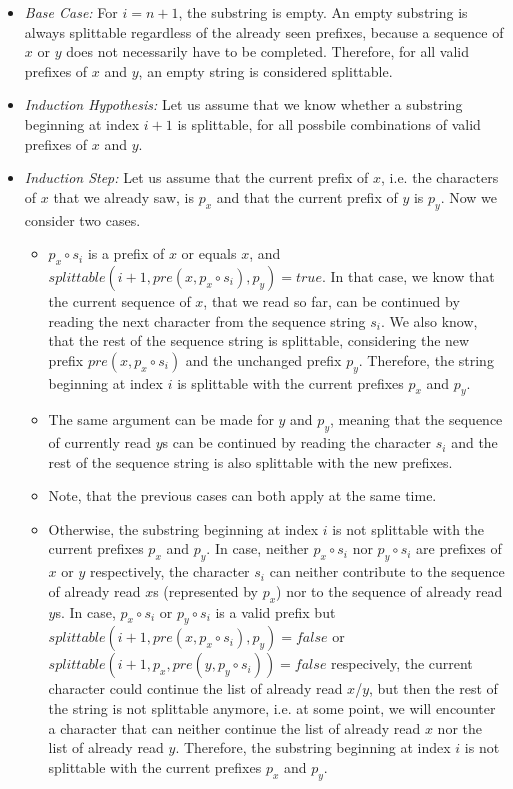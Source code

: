 \documentclass[12pt]{article}
\begin{document}
\begin{itemize}
	\item \emph{Base Case:} For $i = n+1$, the substring is empty. An empty substring is always splittable regardless of the already seen prefixes, because a sequence of $x$ or $y$ does not necessarily have to be completed. Therefore, for all valid prefixes of $x$ and $y$, an empty string is considered splittable.
	\item \emph{Induction Hypothesis:} Let us assume that we know whether a substring beginning at index $i+1$ is splittable, for all possbile combinations of valid prefixes of $x$ and $y$.
	\item \emph{Induction Step:} Let us assume that the current prefix of $x$, i.e. the characters of $x$ that we already saw, is $p_x$ and that the current prefix of $y$ is $p_y$. Now we consider two cases. \begin{itemize}
		\item $p_x \circ s_i$ is a prefix of $x$ or equals $x$, and $\mathit{splittable}(i+1, \mathit{pre}(x, p_x \circ s_i), p_y) = \mathit{true}$. In that case, we know that the current sequence of $x$, that we read so far, can be continued by reading the next character from the sequence string $s_i$. We also know, that the rest of the sequence string is splittable, considering the new prefix $\mathit{pre}(x, p_x \circ s_i)$ and the unchanged prefix $p_y$. Therefore, the string beginning at index $i$ is splittable with the current prefixes $p_x$ and $p_y$.
	\item The same argument can be made for $y$ and $p_y$, meaning that the sequence of currently read $y$s can be continued by reading the character $s_i$ and the rest of the sequence string is also splittable with the new prefixes.
	\item Note, that the previous cases can both apply at the same time.
	\item Otherwise, the substring beginning at index $i$ is not splittable with the current prefixes $p_x$ and $p_y$. In case, neither $p_x \circ s_i$ nor $p_y \circ s_i$ are prefixes of $x$ or $y$ respectively, the character $s_i$ can neither contribute to the sequence of already read $x$s (represented by $p_x$) nor to the sequence of already read $y$s. In case, $p_x \circ s_i$ or $p_y \circ s_i$ is a valid prefix but $\mathit{splittable}(i+1, \mathit{pre}(x,p_x \circ s_i), p_y) = \mathit{false}$ or $\mathit{splittable}(i+1, p_x, \mathit{pre}(y, p_y \circ s_i)) = \mathit{false}$ respecively, the current character could continue the list of already read $x$/$y$, but then the rest of the string is not splittable anymore, i.e. at some point, we will encounter a character that can neither continue the list of already read $x$ nor the list of already read $y$. Therefore, the substring beginning at index $i$ is not splittable with the current prefixes $p_x$ and $p_y$.
	\end{itemize}
\end{itemize}
\end{document}

